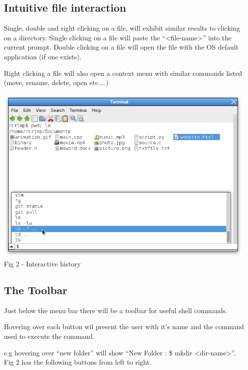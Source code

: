 \documentclass[a4paper,12pt]{article}
\begin{document}
\subsection*{Intuitive file interaction}
Single, double and right clicking on a file, will exhibit similar results to clicking on a directory.
Single clicking on a file will paste the ``\textless file-name\textgreater'' into the current prompt.
Double clicking on a file will open the file with the OS default application (if one exists).

Right clicking a file will also  open a context menu with similar commands listed (move, rename, delete, open etc....)

\begin{center}
  \includegraphics[width=13cm]{history.png}\\
  \small Fig 2 - Interactive history
\end{center}

\subsection*{The Toolbar}
Just below the menu bar there will be a toolbar for useful shell commands.

Hovering over each button wil present the user with it's name and the command used to execute the command.

e.g hovering over ``new folder'' will show ``New Folder : \$ mkdir \textless dir-name\textgreater''. \\

\noindent
Fig 2 has the following buttons from left to right.
\end{document}
